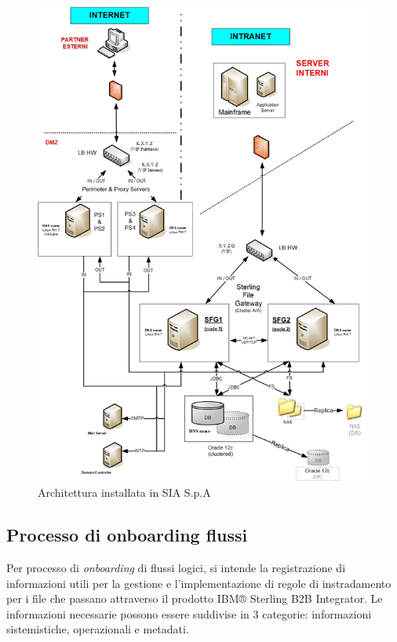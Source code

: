\clearpage

\begin{figure}
\begin{center}
\includegraphics[width=0.9\columnwidth]{images/siaarch.png}
\end{center}
\caption{Architettura installata in SIA S.p.A}
\label{fig:archi_sia}
\end{figure}

\clearpage


\subsection{Processo di onboarding flussi}
\label{subsec:onboarding}
Per processo di \textit{onboarding} di flussi logici, si intende la registrazione di informazioni utili per la gestione e l'implementazione di regole di instradamento per i file che passano attraverso il prodotto IBM® Sterling B2B Integrator.
Le informazioni necessarie possono essere suddivise in 3 categorie: informazioni sistemistiche, operazionali e metadati.


